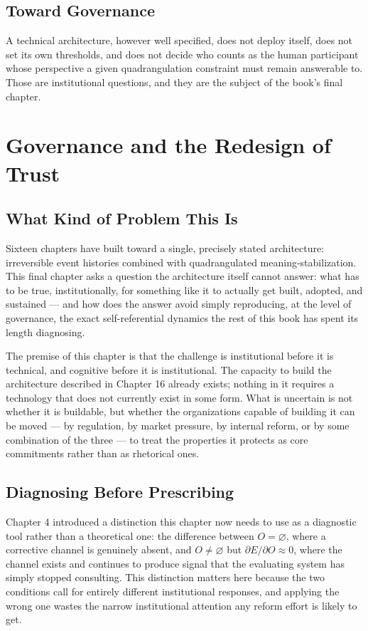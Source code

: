 \documentclass[12pt,a4paper]{book}
\begin{document}
\section{Toward Governance}

A technical architecture, however well specified, does not deploy itself, does not set its own thresholds, and does not decide who counts as the human participant whose perspective a given quadrangulation constraint must remain answerable to. Those are institutional questions, and they are the subject of the book's final chapter.


\chapter{Governance and the Redesign of Trust}

\section{What Kind of Problem This Is}

Sixteen chapters have built toward a single, precisely stated architecture: irreversible event histories combined with quadrangulated meaning-stabilization. This final chapter asks a question the architecture itself cannot answer: what has to be true, institutionally, for something like it to actually get built, adopted, and sustained — and how does the answer avoid simply reproducing, at the level of governance, the exact self-referential dynamics the rest of this book has spent its length diagnosing.

The premise of this chapter is that the challenge is institutional before it is technical, and cognitive before it is institutional. The capacity to build the architecture described in Chapter 16 already exists; nothing in it requires a technology that does not currently exist in some form. What is uncertain is not whether it is buildable, but whether the organizations capable of building it can be moved — by regulation, by market pressure, by internal reform, or by some combination of the three — to treat the properties it protects as core commitments rather than as rhetorical ones.

\section{Diagnosing Before Prescribing}

Chapter 4 introduced a distinction this chapter now needs to use as a diagnostic tool rather than a theoretical one: the difference between $O = \varnothing$, where a corrective channel is genuinely absent, and $O \neq \varnothing$ but $\partial E/\partial O \approx 0$, where the channel exists and continues to produce signal that the evaluating system has simply stopped consulting. This distinction matters here because the two conditions call for entirely different institutional responses, and applying the wrong one wastes the narrow institutional attention any reform effort is likely to get.
\end{document}

